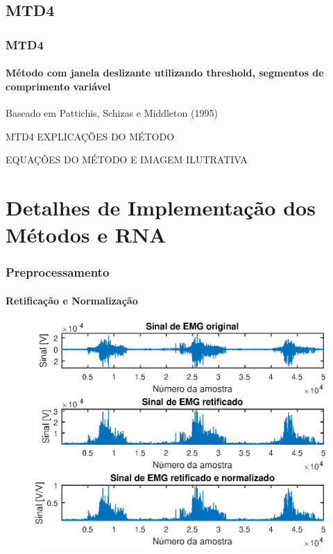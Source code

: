 \documentclass{beamer}
\begin{document}
	\subsection[MTD4]{MTD4}
	\begin{frame}
		\frametitle{MTD4}
		\framesubtitle{Método com janela deslizante utilizando threshold, segmentos de comprimento variável}
		
		Baseado em Pattichis, Schizas e Middleton (1995)
		
		\begin{block}{MTD4}
			EXPLICAÇÕES DO MÉTODO
		\end{block}
		
		EQUAÇÕES DO MÉTODO E IMAGEM ILUTRATIVA
		
	\end{frame}

	\section[Implementação]{Detalhes de Implementação dos Métodos e RNA}
	
	\begin{frame}
		\frametitle{Preprocessamento}
		\framesubtitle{Retificação e Normalização}
		\begin{figure}
			\begin{center}
				\includegraphics[width=\textwidth]{./img/prettyRaw.eps}
			\end{center}
		\end{figure}
	\end{frame}
	
\end{document}
